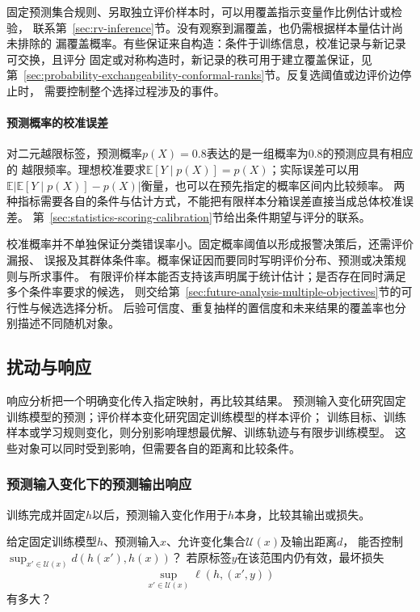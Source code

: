 固定预测集合规则、另取独立评价样本时，可以用覆盖指示变量作比例估计或检验，
联系第~\ref{sec:rv-inference}节。没有观察到漏覆盖，也仍需根据样本量估计尚未排除的
漏覆盖概率。有些保证来自构造：条件于训练信息，校准记录与新记录可交换，且评分
固定或对称构造时，新记录的秩可用于建立覆盖保证，见
第~\ref{sec:probability-exchangeability-conformal-ranks}节。反复选阈值或边评价边停止时，
需要控制整个选择过程涉及的事件。

\paragraph{预测概率的校准误差}

对二元越限标签，预测概率$p(X)=0.8$表达的是一组概率为$0.8$的预测应具有相应的
越限频率。理想校准要求$\mathbb E[Y\mid p(X)]=p(X)$；实际误差可以用
$\mathbb E|\mathbb E[Y\mid p(X)]-p(X)|$衡量，也可以在预先指定的概率区间内比较频率。
两种指标需要各自的条件与估计方式，不能把有限样本分箱误差直接当成总体校准误差。
第~\ref{sec:statistics-scoring-calibration}节给出条件期望与评分的联系。

校准概率并不单独保证分类错误率小。固定概率阈值以形成报警决策后，还需评价漏报、
误报及其群体条件率。概率保证因而要同时写明评价分布、预测或决策规则与所求事件。
有限评价样本能否支持该声明属于统计估计；是否存在同时满足多个条件率要求的候选，
则交给第~\ref{sec:future-analysis-multiple-objectives}节的可行性与候选选择分析。
后验可信度、重复抽样的置信度和未来结果的覆盖率也分别描述不同随机对象。

\subsection{扰动与响应}
\label{sec:future-robustness-security-map}
\label{sec:future-privacy-unlearning-map}

响应分析把一个明确变化传入指定映射，再比较其结果。
预测输入变化研究固定训练模型的预测；评价样本变化研究固定训练模型的样本评价；
训练目标、训练样本或学习规则变化，则分别影响理想最优解、训练轨迹与有限步训练模型。
这些对象可以同时受到影响，但需要各自的距离和比较条件。

\subsubsection{预测输入变化下的预测输出响应}
\label{sec:future-analysis-robustness}

训练完成并固定$h$以后，预测输入变化作用于$h$本身，比较其输出或损失。

\begin{mathproblem}[固定预测器的局部扰动与分布风险]
  \label{question:future-robustness}
  给定固定训练模型$h$、预测输入$x$、允许变化集合$\mathcal U(x)$及输出距离$d$，
  能否控制$\sup_{x'\in\mathcal U(x)}d(h(x'),h(x))$？
  若原标签$y$在该范围内仍有效，最坏损失
  \[
    \sup_{x'\in\mathcal U(x)}\ell(h,(x',y))
  \]
  有多大？
\end{mathproblem}


